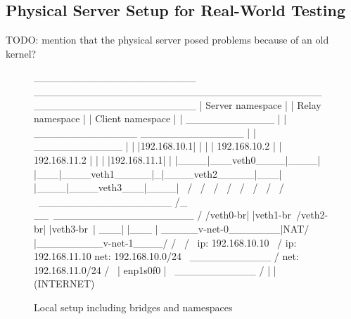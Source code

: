 \subsection{Physical Server Setup for Real-World Testing}\label{subsec:physical_server_setup}
TODO: mention that the physical server posed problems because of an old kernel?

\vspace{0.5cm}
\begin{figure}[H]
\centering
\begin{myverbatim}
 ______________________         _______________________________________        ______________________
|   Server namespace   |       |            Relay namespace            |      |   Client namespace   |
|     ____________     |       |    ______________   ______________    |      |     ____________     |
|    |192.168.10.1|    |       |   | 192.168.10.2 | | 192.168.11.2 |   |      |    |192.168.11.1|    |
|____|___veth0____|____|       |___|____veth1_____|_|____veth2_____|___|      |____|____veth3___|____|
            \                            /                 \                             /
             \                          /                   \                           /
              \                        /                     \                         /
               \                      /                       \                       /
                \ __________________ /_                      __\ ___________________ /
                /veth0-br|     |veth1-br\                   /veth2-br|      |veth3-br\
                |                    ___|                   |___                     |
                \_____v-net-0_______|NAT/                   \NAT|_________v-net-1____/
                        /              \                     /                \
               ip: 192.168.10.10        \                   /         ip: 192.168.11.10
               net: 192.168.10.0/24      \   ___________   /          net: 192.168.11.0/24
                                           /             \
                                          |   enp1s0f0    |
                                           \ ___________ /
                                                  |
                                                  |
                                              (INTERNET)

\end{myverbatim}
\caption{Local setup including bridges and namespaces}\label{fig:namespace_setup}
\end{figure}
\vspace{0.5cm}